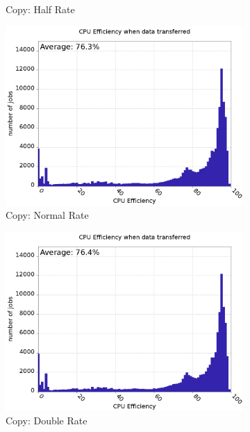\documentclass[a4paper]{jpconf}
\begin{document}
\begin{figure}
\begin{center}
\begin{subfigure}{0.3\textwidth}
      \caption{Copy: Half Rate\label{fig:cpuEffCopyH}}
    \end{subfigure}
    \begin{subfigure}{0.3\textwidth}
      \includegraphics[width=\textwidth]{figures/S_FP0_RP0CPUEff.png}
      \caption{Copy: Normal Rate\label{fig:cpuEffCopyN}}
    \end{subfigure}
    \begin{subfigure}{0.3\textwidth}
      \includegraphics[width=\textwidth]{figures/S_FP1_RP0CPUEff.png}
      \caption{Copy: Double Rate\label{fig:cpuEffCopyD}}
    \end{subfigure}
    \begin{subfigure}{0.3\textwidth}

\end{subfigure}
\end{center}
\end{figure}
\end{document}
